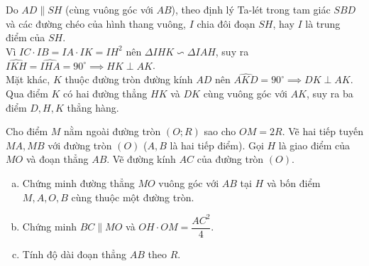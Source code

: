 \begin{bt}
{\begin{enumerate}[a)]
	Do $AD \parallel SH$ (cùng vuông góc với $AB$), theo định lý Ta-lét trong tam giác $SBD$ và các đường chéo của hình thang vuông, $I$ chia đôi đoạn $SH$, hay $I$ là trung điểm của $SH$.\\
	Vì $IC \cdot IB = IA \cdot IK = IH^2$ nên $\Delta IHK \backsim \Delta IAH$, suy ra $\widehat{IKH} = \widehat{IHA} = 90^\circ \implies HK \perp AK$.\\
	Mặt khác, $K$ thuộc đường tròn đường kính $AD$ nên $\widehat{AKD} = 90^\circ \implies DK \perp AK$.\\
	Qua điểm $K$ có hai đường thẳng $HK$ và $DK$ cùng vuông góc với $AK$, suy ra ba điểm $D, H, K$ thẳng hàng.
\end{enumerate}
}
\end{bt}

\begin{bt}%
Cho điểm $M$ nằm ngoài đường tròn $(O;R)$ sao cho $OM = 2R$. Vẽ hai tiếp tuyến $MA, MB$ với đường tròn $(O)$ ($A, B$ là hai tiếp điểm). Gọi $H$ là giao điểm của $MO$ và đoạn thẳng $AB$. Vẽ đường kính $AC$ của đường tròn $(O)$.
\begin{enumerate}[a)]
	\item Chứng minh đường thẳng $MO$ vuông góc với $AB$ tại $H$ và bốn điểm $M, A, O, B$ cùng thuộc một đường tròn.
	\item Chứng minh $BC \parallel MO$ và $OH \cdot OM = \dfrac{AC^2}{4}$.
	\item Tính độ dài đoạn thẳng $AB$ theo $R$.
\end{enumerate}
\end{bt}
